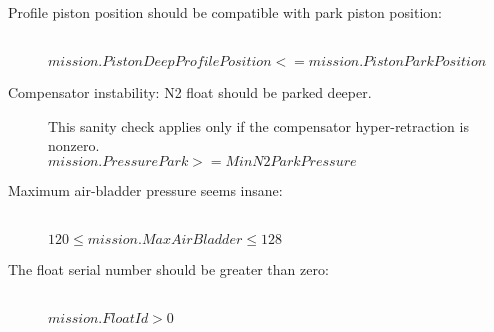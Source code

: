 \begin{description}
\item[\textnormal{Profile piston position should be compatible with park piston position:}]\ \\
  $mission.PistonDeepProfilePosition <= mission.PistonParkPosition$
\item[\textnormal{Compensator instability: N2 float should be parked
    deeper.}]  This sanity check applies only if the compensator
    hyper-retraction is nonzero. \\
  $mission.PressurePark >= MinN2ParkPressure$


\item[\textnormal{Maximum air-bladder pressure seems insane:}]\ \\
  $120 \le mission.MaxAirBladder \le 128$

\item[\textnormal{The float serial number should be greater than zero:}]\ \\
  $mission.FloatId>0$

\end{description}


